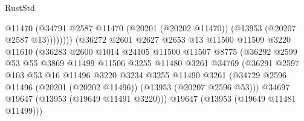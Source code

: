 \begin{lexlean}{RustStd}
\begin{coremodule}
                                            @11470
                                            (@34791
                                              @2587
                                              @11470
                                              (@20201 (@20202 @11470))
                                              (@13953 (@20207 @2587 @13))))))))
                                  (@36272
                                    @2601
                                    @2627
                                    @2653
                                    @13
                                    @11500
                                    @11509
                                    @3220
                                    @11610
                                    (@36283
                                      @2600
                                      @1014
                                      @24105
                                      @11500
                                      @11507
                                      @8775
                                      (@36292
                                        @2599
                                        @53
                                        @55
                                        @3869
                                        @11499
                                        @11506
                                        @3255
                                        @11480
                                        @3261
                                        @34769
                                        (@36291
                                          @2597
                                          @103
                                          @53
                                          @16
                                          @11496
                                          @3220
                                          @3234
                                          @3255
                                          @11490
                                          @3261
                                          (@34729
                                            @2596
                                            @11496
                                            (@20201 (@20202 @11496))
                                            (@13953 (@20207 @2596 @53)))
                                          @34697
                                          @19647
                                          (@13953 (@19649 @11491 @3220)))
                                        @19647
                                        (@13953 (@19649 @11481 @11499)))

\end{coremodule}
\end{lexlean}
